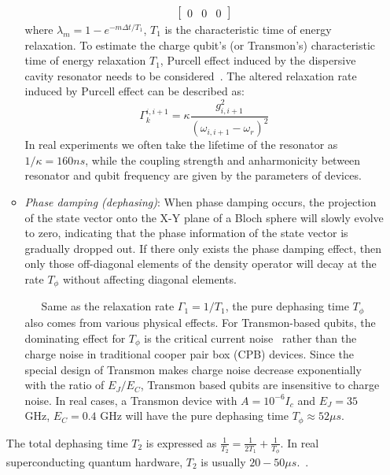 \documentclass[conference, 9pt]{IEEEtran}
\begin{document}
\begin{itemize}
\begin{itemize}
\begin{equation*}
\begin{aligned}
\begin{bmatrix}
            0 & 0 & 0
            \end{bmatrix}
        \end{aligned}
        \end{equation*}
        where $\lambda_m = 1 - e^ {-m\Delta t/T_1}$, $T_1$ is the characteristic time of energy relaxation. 
        \fi
        To estimate the charge qubit's (or Transmon's) characteristic time of energy relaxation $T_1$, Purcell effect induced by the dispersive cavity resonator needs to be considered~\cite{Koch_2007}. The altered relaxation rate induced by Purcell effect can be described as: 
        \begin{equation}
            \Gamma_k^{i,i+1} = \kappa \frac{g_{i,i+1}^2}{(\omega_{i,i+1} - \omega_r)^2}
        \end{equation}
        In real experiments we often take the lifetime of the resonator as $1/\kappa = 160ns$, while the coupling strength and anharmonicity between resonator and qubit frequency are given by the parameters of devices. 
        
        \item \textit{Phase damping (dephasing)}: When phase damping occurs, the projection of the state vector onto the X-Y plane of a Bloch sphere will slowly evolve to zero, indicating that the phase information of the state vector is gradually dropped out. If there only exists the phase damping effect, then only those off-diagonal elements of the density operator will decay at the rate $T_\phi$ without affecting diagonal elements. 
        
       \ \ \ Same as the relaxation rate $\Gamma_1 = 1/T_1$, the pure dephasing time $T_\phi$ also comes from various physical effects. 
       For Transmon-based qubits, the dominating effect for $T_\phi$ is the critical current noise~\cite{Koch_2007} rather than the charge noise in traditional cooper pair box (CPB) devices. 
       Since the special design of Transmon makes charge noise decrease exponentially with the ratio of $E_J/E_C$, Transmon based qubits are insensitive to charge noise. In real cases, a Transmon device with $ A = 10^{-6}I_c$ and $E_J = 35$ GHz, $E_C = 0.4$ GHz will have the pure dephasing time $T_{\phi} \approx 52\mu s.$ 
    \end{itemize}
The total dephasing time $T_2$ is expressed as $\frac{1}{T_2} = \frac{1}{2T_1}+\frac{1}{T_\phi}$. In real superconducting quantum hardware, $T_2$ is usually $20-50\mu s$.~\cite{PhysRevResearch.2.033447,Koch_2007}. 
\end{itemize}
\end{document}
